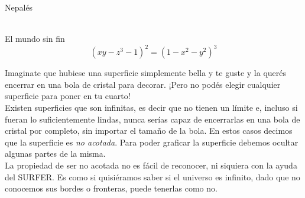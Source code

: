 \documentclass[es]{SurferDesc}%
\begin{document}
\footnotesize

\begin{surferPage}
  \begin{surferTitle}Nepalés\end{surferTitle}  \\
El mundo sin fin\\

\smallskip
\[(x y - z^3 -1)^2= (1 - x^2	- y^2)^3\]

\singlespacing
Imaginate que hubiese una superficie simplemente bella y te guste y la querés encerrar en una bola de cristal para decorar. ¡Pero no podés elegir cualquier superficie para poner en tu cuarto!
\\
\singlespacing
Existen superficies que son infinitas, es decir que no tienen un límite e, incluso si fueran lo suficientemente lindas, nunca serías capaz de encerrarlas en una bola de cristal por completo, sin importar el tamaño de la bola. En estos casos decimos que la superficie es \textit{no acotada}. Para poder graficar la superficie debemos ocultar algunas partes de la misma.
\\
\singlespacing
La propiedad de ser no acotada no es fácil de reconocer, ni siquiera con la ayuda del SURFER. Es como si quisiéramos saber si el universo es infinito, dado que no conocemos sus bordes o fronteras, puede tenerlas como no.
  \begin{surferText}
     \end{surferText}
\end{surferPage}
\end{document}
